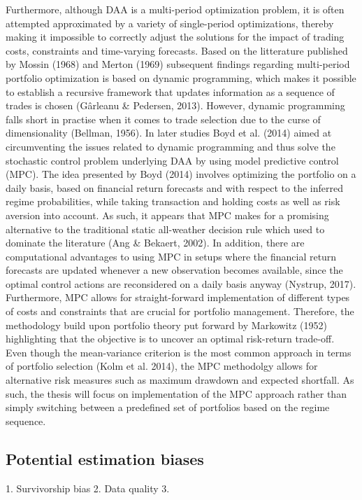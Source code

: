 Furthermore, although DAA is a multi-period optimization problem, it is often attempted approximated by a variety of single-period optimizations, thereby making it impossible to correctly adjust the solutions for the impact of trading costs, constraints and time-varying forecasts. Based on the litterature published by Mossin (1968) and Merton (1969) subsequent findings regarding multi-period portfolio optimization is based on dynamic programming, which makes it possible to establish a recursive framework that updates information as a sequence of trades is chosen (Gârleanu \& Pedersen, 2013). However, dynamic programming falls short in practise when it comes to trade selection due to the curse of dimensionality (Bellman, 1956). In later studies Boyd et al. (2014) aimed at circumventing the issues related to dynamic programming and thus solve the stochastic control problem underlying DAA by using model predictive control (MPC). The idea presented by Boyd (2014) involves optimizing the portfolio on a daily basis, based on financial return forecasts and with respect to the inferred regime probabilities, while taking transaction and holding costs as well as risk aversion into account. As such, it appears that MPC makes for a promising alternative to the traditional static all-weather decision rule which used to dominate the literature (Ang \& Bekaert, 2002). In addition, there are computational advantages to using MPC in setups where the financial return forecasts are updated whenever a new observation becomes available, since the optimal
control actions are reconsidered on a daily basis anyway (Nystrup, 2017). Furthermore, MPC allows for straight-forward implementation of different types of costs and constraints that are crucial for portfolio management. Therefore, the methodology build upon portfolio theory put forward by Markowitz (1952) highlighting that the objective is to uncover an optimal risk-return trade-off. Even though the mean-variance criterion is the most common approach in terms of portfolio selection (Kolm et al. 2014), the MPC methodolgy allows for alternative risk measures such as maximum drawdown and expected shortfall. As such, the thesis will focus on implementation of the MPC approach rather than simply switching between a predefined set of portfolios based on the regime sequence.  



\subsection*{Potential estimation biases}
1. Survivorship bias
2. Data quality
3. 

